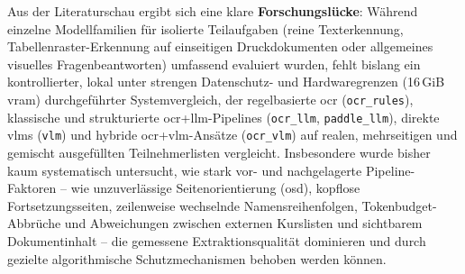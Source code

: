 Aus der Literaturschau ergibt sich eine klare \textbf{Forschungslücke}: Während einzelne Modellfamilien für isolierte Teilaufgaben (reine Texterkennung, Tabellenraster-Erkennung auf einseitigen Druckdokumenten oder allgemeines visuelles Fragenbeantworten) umfassend evaluiert wurden, fehlt bislang ein kontrollierter, lokal unter strengen Datenschutz- und Hardwaregrenzen (\mbox{16\,GiB} \ac{vram}) durchgeführter Systemvergleich, der regelbasierte \ac{ocr} (\texttt{ocr\_rules}), klassische und strukturierte \ac{ocr}+\ac{llm}-Pipelines (\texttt{ocr\_llm}, \texttt{paddle\_llm}), direkte \acp{vlm} (\texttt{vlm}) und hybride \ac{ocr}+\ac{vlm}-Ansätze (\texttt{ocr\_vlm}) auf realen, mehrseitigen und gemischt ausgefüllten Teilnehmerlisten vergleicht. Insbesondere wurde bisher kaum systematisch untersucht, wie stark vor- und nachgelagerte Pipeline-Faktoren -- wie unzuverlässige Seitenorientierung (\ac{osd}), kopflose Fortsetzungsseiten, zeilenweise wechselnde Namensreihenfolgen, Tokenbudget-Abbrüche und Abweichungen zwischen externen Kurslisten und sichtbarem Dokumentinhalt -- die gemessene Extraktionsqualität dominieren und durch gezielte algorithmische Schutzmechanismen behoben werden können.

